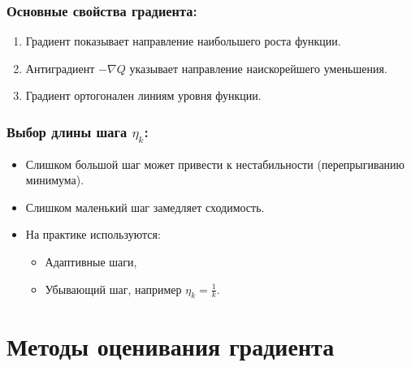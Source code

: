 \hypertarget{ux43eux441ux43dux43eux432ux43dux44bux435-ux441ux432ux43eux439ux441ux442ux432ux430-ux433ux440ux430ux434ux438ux435ux43dux442ux430}{%
\subsubsection*{Основные свойства
градиента:}\label{ux43eux441ux43dux43eux432ux43dux44bux435-ux441ux432ux43eux439ux441ux442ux432ux430-ux433ux440ux430ux434ux438ux435ux43dux442ux430}}

\begin{enumerate}
\def\labelenumi{\arabic{enumi}.}
\tightlist
\item
  Градиент показывает направление наибольшего роста функции.
\item
  Антиградиент \(-\nabla Q\) указывает направление наискорейшего
  уменьшения.
\item
  Градиент ортогонален линиям уровня функции.
\end{enumerate}

\hypertarget{ux432ux44bux431ux43eux440-ux434ux43bux438ux43dux44b-ux448ux430ux433ux430-eta_k}{%
\subsubsection*{\texorpdfstring{Выбор длины шага
\(\eta_k\):}{Выбор длины шага (\textbackslash eta\_k):}}\label{ux432ux44bux431ux43eux440-ux434ux43bux438ux43dux44b-ux448ux430ux433ux430-eta_k}}

\begin{itemize}
\tightlist
\item
  Слишком большой шаг может привести к нестабильности
  (перепрыгиванию минимума).
\item
  Слишком маленький шаг замедляет сходимость.
\item
  На практике используются:

  \begin{itemize}
  \tightlist
  \item
    Адаптивные шаги,
  \item
    Убывающий шаг, например \(\eta_k = \frac{1}{k}\).
  \end{itemize}
\end{itemize}

\hypertarget{ux43cux435ux442ux43eux434ux44b-ux43eux446ux435ux43dux438ux432ux430ux43dux438ux44f-ux433ux440ux430ux434ux438ux435ux43dux442ux430}{%
\section{Методы оценивания
градиента}\label{ux43cux435ux442ux43eux434ux44b-ux43eux446ux435ux43dux438ux432ux430ux43dux438ux44f-ux433ux440ux430ux434ux438ux435ux43dux442ux430}}

